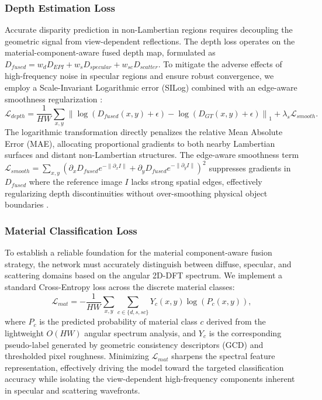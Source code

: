\documentclass[lettersize,journal]{IEEEtran}
\begin{document}
\subsubsection{Depth Estimation Loss}
Accurate disparity prediction in non-Lambertian regions requires decoupling the geometric signal from view-dependent reflections. The depth loss operates on the material-component-aware fused depth map, formulated as $D_{fused} = w_d D_{EPI} + w_s D_{specular} + w_{sc} D_{scatter}$. To mitigate the adverse effects of high-frequency noise in specular regions and ensure robust convergence, we employ a Scale-Invariant Logarithmic error (SILog) combined with an edge-aware smoothness regularization \cite{godard2019}:
\begin{equation}
\label{eq:depth_loss}
\mathcal{L}_{depth} = \frac{1}{HW} \sum_{x,y} \left\| \log \left( D_{fused}(x,y) + \epsilon \right) - \log \left( D_{GT}(x,y) + \epsilon \right) \right\|_1 + \lambda_{s} \mathcal{L}_{smooth}.
\end{equation}
The logarithmic transformation directly penalizes the relative Mean Absolute Error (MAE), allocating proportional gradients to both nearby Lambertian surfaces and distant non-Lambertian structures. The edge-aware smoothness term $\mathcal{L}_{smooth} = \sum_{x,y} \left( \partial_x D_{fused} e^{-\|\partial_x I\|} + \partial_y D_{fused} e^{-{\|\partial_y I\|}} \right)^2$ suppresses gradients in $D_{fused}$ where the reference image $I$ lacks strong spatial edges, effectively regularizing depth discontinuities without over-smoothing physical object boundaries \cite{eigen2014}.

\subsubsection{Material Classification Loss}
To establish a reliable foundation for the material component-aware fusion strategy, the network must accurately distinguish between diffuse, specular, and scattering domains based on the angular 2D-DFT spectrum. We implement a standard Cross-Entropy loss across the discrete material classes:
\begin{equation}
\label{eq:mat_loss}
\mathcal{L}_{mat} = - \frac{1}{HW} \sum_{x,y} \sum_{c \in \{d, s, sc\}} Y_{c}(x,y) \log \left( P_{c}(x,y) \right),
\end{equation}
where $P_{c}$ is the predicted probability of material class $c$ derived from the lightweight $O(HW)$ angular spectrum analysis, and $Y_{c}$ is the corresponding pseudo-label generated by geometric consistency descriptors (GCD) and thresholded pixel roughness. Minimizing $\mathcal{L}_{mat}$ sharpens the spectral feature representation, effectively driving the model toward the targeted classification accuracy while isolating the view-dependent high-frequency components inherent in specular and scattering wavefronts.
\end{document}
